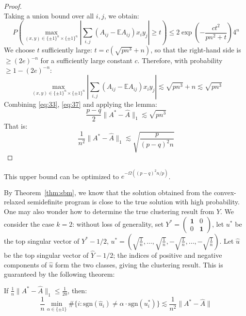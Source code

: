 \begin{proof}
\begin{equation*}
\end{equation*}
Taking a union bound over all $i, j$, we obtain:
\begin{equation*}
\label{eq:39}
P\left( \max_{(x,y) \in \{\pm 1\}^n \times \{\pm 1\}^n} \left| \sum_{i,j} (A_{ij} - \mathbb{E}A_{ij}) x_i y_j \right| \geq t \right) \leq 2 \exp\left(-\frac{ct^2}{pn^2 + t}\right) 4^n
\end{equation*}
We choose $t$ sufficiently large: $t = c(\sqrt{pn^3} + n)$, so that the right-hand side is $\geq (2e)^{-n}$ for a sufficiently large constant $c$. Therefore, with probability $\geq 1 - (2e)^{-n}$:
\begin{equation*}
\label{eq:40}
\max_{(x,y) \in \{\pm 1\}^n \times \{\pm 1\}^n} \left| \sum_{i,j} (A_{ij} - \mathbb{E}A_{ij}) x_i y_j \right| \lesssim \sqrt{pn^3} + n \lesssim \sqrt{pn^3}
\end{equation*}
Combining \eqref{eq:33}, \eqref{eq:37} and applying the lemma:
\begin{equation*}
\label{eq:41}
\frac{p-q}{2} \|A^* - \hat{A}\|_1 \lesssim \sqrt{pn^3}
\end{equation*}
That is:
\begin{equation*}
\label{eq:42}
\frac{1}{n^2} \|A^* - \hat{A}\|_1 \lesssim \sqrt{\frac{p}{(p-q)^2 n}}
\end{equation*}
\end{proof}

\begin{rem}
This upper bound can be optimized to $e^{-\Omega((p-q)^2 n / p)}$.
\end{rem}

By Theorem~\ref{thm:sbm}, we know that the solution obtained from the convex-relaxed semidefinite program is close to the true solution with high probability. One may also wonder how to determine the true clustering result from $\hat{Y}$. We consider the case $k = 2$: without loss of generality, set $Y^* = \begin{pmatrix} \mathbf{1} & 0 \\ 0 & \mathbf{1} \end{pmatrix}$, let $u^*$ be the top singular vector of $Y^* - 1/2$, $u^* = \left( \sqrt{\tfrac{1}{n}}, \ldots, \sqrt{\tfrac{1}{n}}, -\sqrt{\tfrac{1}{n}}, \ldots, -\sqrt{\tfrac{1}{n}} \right)$. Let $\hat{u}$ be the top singular vector of $\hat{Y} - 1/2$; the indices of positive and negative components of $\hat{u}$ form the two classes, giving the clustering result. This is guaranteed by the following theorem:

\begin{thm}
If $\frac{1}{n} \|A^* - \hat{A}\|_1 \leq \frac{1}{20}$, then:
\begin{equation*}
\frac{1}{n} \min_{\alpha \in \{\pm 1\}} \#\{i : \mathrm{sgn}(\hat{u}_i) \neq \alpha \cdot \mathrm{sgn}(u^*_i)\} \lesssim \frac{1}{n^2} \|A^* - \hat{A}\|
\end{equation*}
\end{thm}

